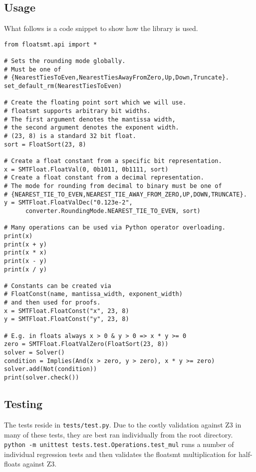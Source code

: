 \documentclass[a4paper,UKenglish,cleveref, autoref, thm-restate]{lipics-v2019}
\begin{document}
\subsection{Usage}
What follows is a code snippet to show how the library is used.
\begin{lstlisting}
from floatsmt.api import *

# Sets the rounding mode globally.
# Must be one of 
# {NearestTiesToEven,NearestTiesAwayFromZero,Up,Down,Truncate}.
set_default_rm(NearestTiesToEven)

# Create the floating point sort which we will use.
# floatsmt supports arbitrary bit widths.
# The first argument denotes the mantissa width,
# the second argument denotes the exponent width.
# (23, 8) is a standard 32 bit float.
sort = FloatSort(23, 8)

# Create a float constant from a specific bit representation.
x = SMTFloat.FloatVal(0, 0b1011, 0b1111, sort)
# Create a float constant from a decimal representation. 
# The mode for rounding from decimal to binary must be one of
# {NEAREST_TIE_TO_EVEN,NEAREST_TIE_AWAY_FROM_ZERO,UP,DOWN,TRUNCATE}.
y = SMTFloat.FloatValDec("0.123e-2", 
      converter.RoundingMode.NEAREST_TIE_TO_EVEN, sort)

# Many operations can be used via Python operator overloading.
print(x)
print(x + y)
print(x * x)
print(x - y) 
print(x / y)

# Constants can be created via 
# FloatConst(name, mantissa_width, exponent_width)
# and then used for proofs.
x = SMTFloat.FloatConst("x", 23, 8)
y = SMTFloat.FloatConst("y", 23, 8)

# E.g. in floats always x > 0 & y > 0 => x * y >= 0
zero = SMTFloat.FloatValZero(FloatSort(23, 8))
solver = Solver()
condition = Implies(And(x > zero, y > zero), x * y >= zero)
solver.add(Not(condition))
print(solver.check())
\end{lstlisting}

\subsection{Testing}
The tests reside in \verb|tests/test.py|. Due to the costly validation against Z3 in many of these tests, they are best ran individually from the root directory. \\
\verb|python -m unittest tests.test.Operations.test_mul| runs a number of individual regression tests and then validates the floatsmt multiplication for half-floats against Z3.
\end{document}

